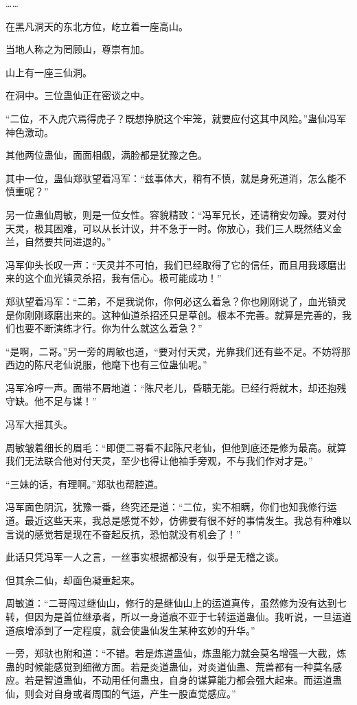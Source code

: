 \begin{this_body}
……

在黑凡洞天的东北方位，屹立着一座高山。

当地人称之为罔顾山，尊崇有加。

山上有一座三仙洞。

在洞中。三位蛊仙正在密谈之中。

“二位，不入虎穴焉得虎子？既想挣脱这个牢笼，就要应付这其中风险。”蛊仙冯军神色激动。

其他两位蛊仙，面面相觑，满脸都是犹豫之色。

其中一位，蛊仙郑驮望着冯军：“兹事体大，稍有不慎，就是身死道消，怎么能不慎重呢？”

另一位蛊仙周敏，则是一位女性。容貌精致：“冯军兄长，还请稍安勿躁。要对付天灵，极其困难，可以从长计议，并不急于一时。你放心，我们三人既然结义金兰，自然要共同进退的。”

冯军仰头长叹一声：“天灵并不可怕，我们已经取得了它的信任，而且用我琢磨出来的这个血光镇灵杀招，我有信心。极可能成功！”

郑驮望着冯军：“二弟，不是我说你，你何必这么着急？你也刚刚说了，血光镇灵是你刚刚琢磨出来的。这种仙道杀招还只是草创。根本不完善。就算是完善的，我们也要不断演练才行。你为什么就这么着急？”

“是啊，二哥。”另一旁的周敏也道，“要对付天灵，光靠我们还有些不足。不妨将那西边的陈尺老仙说服，他麾下也有三位蛊仙呢。”

冯军冷哼一声。面带不屑地道：“陈尺老儿，昏聩无能。已经行将就木，却还抱残守缺。他不足与谋！”

冯军大摇其头。

周敏皱着细长的眉毛：“即便二哥看不起陈尺老仙，但他到底还是修为最高。就算我们无法联合他对付天灵，至少也得让他袖手旁观，不与我们作对才是。”

“三妹的话，有理啊。”郑驮也帮腔道。

冯军面色阴沉，犹豫一番，终究还是道：“二位，实不相瞒，你们也知我修行运道。最近这些天来，我总是感觉不妙，仿佛要有很不好的事情发生。我总有种难以言说的感觉若是现在不奋起反抗，恐怕就没有机会了！”

此话只凭冯军一人之言，一丝事实根据都没有，似乎是无稽之谈。

但其余二仙，却面色凝重起来。

周敏道：“二哥闯过继仙山，修行的是继仙山上的运道真传，虽然修为没有达到七转，但因为是首位继承者，所以一身道痕不亚于七转运道蛊仙。我听说，一旦运道道痕增添到了一定程度，就会使蛊仙发生某种玄妙的升华。”

一旁，郑驮也附和道：“不错。若是炼道蛊仙，炼蛊能力就会莫名增强一大截，炼蛊的时候能感觉到细微方面。若是炎道蛊仙，对炎道仙蛊、荒兽都有一种莫名感应。若是智道蛊仙，不动用任何蛊虫，自身的谋算能力都会强大起来。而运道蛊仙，则会对自身或者周围的气运，产生一股直觉感应。”


\end{this_body}
